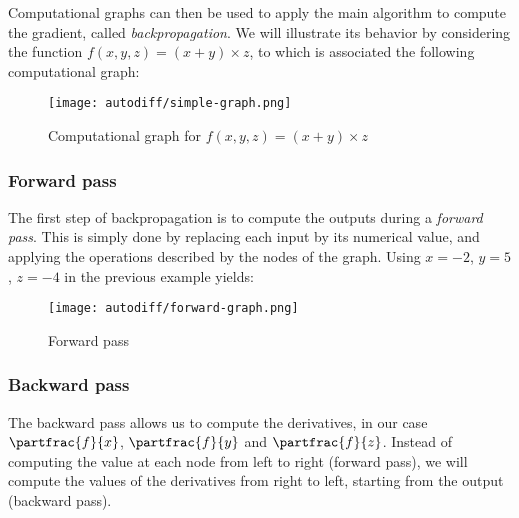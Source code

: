 Computational graphs can then be used to apply the main algorithm to compute the gradient, called \emph{backpropagation}. We will illustrate its behavior by considering the function $f(x, y, z) = (x+y)\times z$, to which is associated the following computational graph:
\begin{figure}[H]
    \centering
    \texttt{[image: autodiff/simple-graph.png]}
    \caption{Computational graph for $f(x, y, z) = (x+y)\times z$}
\end{figure}

\subsubsection{Forward pass}
The first step of backpropagation is to compute the outputs during a \emph{forward pass}. This is simply done by replacing each input by its numerical value, and applying the operations described by the nodes of the graph. Using $x=-2$, $y=5$, $z=-4$ in the previous example yields:
\begin{figure}[H]
    \centering
    \texttt{[image: autodiff/forward-graph.png]}
    \caption{Forward pass}
\end{figure}

\subsubsection{Backward pass}
The backward pass allows us to compute the derivatives, in our case $\partfrac{f}{x}$, $\partfrac{f}{y}$ and $\partfrac{f}{z}$. Instead of computing the value at each node from left to right (forward pass), we will compute the values of the derivatives from right to left, starting from the output (backward pass).

